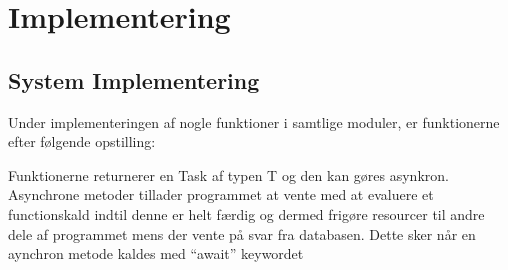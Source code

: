 \section{Implementering}
\subsection{System Implementering}
Under implementeringen af nogle funktioner i samtlige moduler, er funktionerne efter følgende opstilling:\\


Funktionerne returnerer en Task af typen T og den kan gøres asynkron. Asynchrone metoder tillader programmet
at vente med at evaluere et functionskald indtil denne er helt færdig og dermed frigøre resourcer til andre
dele af programmet mens der vente på svar fra databasen.
Dette sker når en aynchron metode kaldes med ``await'' keywordet \\




